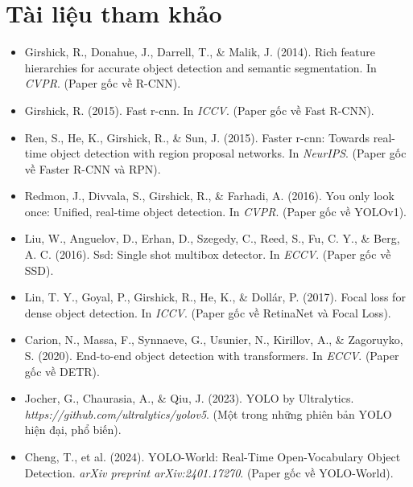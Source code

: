 \section*{Tài liệu tham khảo}
\begin{itemize}
	\item[1] Girshick, R., Donahue, J., Darrell, T., \& Malik, J. (2014). Rich feature hierarchies for accurate object detection and semantic segmentation. In \textit{CVPR}. (Paper gốc về R-CNN).
	\item[2] Girshick, R. (2015). Fast r-cnn. In \textit{ICCV}. (Paper gốc về Fast R-CNN).
	\item[3] Ren, S., He, K., Girshick, R., \& Sun, J. (2015). Faster r-cnn: Towards real-time object detection with region proposal networks. In \textit{NeurIPS}. (Paper gốc về Faster R-CNN và RPN).
	\item[4] Redmon, J., Divvala, S., Girshick, R., \& Farhadi, A. (2016). You only look once: Unified, real-time object detection. In \textit{CVPR}. (Paper gốc về YOLOv1).
	\item[5] Liu, W., Anguelov, D., Erhan, D., Szegedy, C., Reed, S., Fu, C. Y., \& Berg, A. C. (2016). Ssd: Single shot multibox detector. In \textit{ECCV}. (Paper gốc về SSD).
	\item[6] Lin, T. Y., Goyal, P., Girshick, R., He, K., \& Dollár, P. (2017). Focal loss for dense object detection. In \textit{ICCV}. (Paper gốc về RetinaNet và Focal Loss).
	\item[7] Carion, N., Massa, F., Synnaeve, G., Usunier, N., Kirillov, A., \& Zagoruyko, S. (2020). End-to-end object detection with transformers. In \textit{ECCV}. (Paper gốc về DETR).
	\item[8] Jocher, G., Chaurasia, A., \& Qiu, J. (2023). YOLO by Ultralytics. \textit{https://github.com/ultralytics/yolov5}. (Một trong những phiên bản YOLO hiện đại, phổ biến).
	\item[9] Cheng, T., et al. (2024). YOLO-World: Real-Time Open-Vocabulary Object Detection. \textit{arXiv preprint arXiv:2401.17270}. (Paper gốc về YOLO-World).
\end{itemize}
